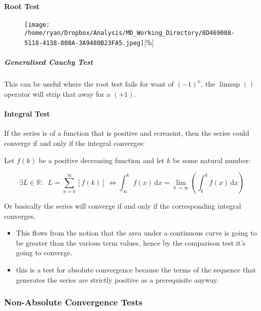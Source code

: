 \documentclass[
]{article}
\let\oldparagraph\paragraph
\renewcommand{\paragraph}[1]{\oldparagraph{#1}\mbox{}}
\let\oldsubparagraph\subparagraph
\renewcommand{\subparagraph}[1]{\oldsubparagraph{#1}\mbox{}}
\begin{document}
\newpage 

\hypertarget{header-n3270}{%
\paragraph{Root Test}\label{header-n3270}}

\begin{figure}
\centering
\texttt{[image: /home/ryan/Dropbox/Analysis/MD\_Working\_Directory/8D469008-5118-4138-808A-3A9480B23FA5.jpeg]}[!h]
\caption{}
\end{figure}

\hypertarget{header-n3274}{%
\subparagraph{\texorpdfstring{Generalised \emph{Cauchy}
Test}{Generalised Cauchy Test}}\label{header-n3274}}

This can be useful where the root test fails for want of \((-1)^n\), the
\(\limsup()\) operator will strip that away for a \((+1)\).

\hypertarget{header-n3276}{%
\paragraph{Integral Test}\label{header-n3276}}

If the series is of a function that is positive and ecreasint, then the
series could converge if and only if the integral converges:

Let \(f(k)\) be a positive decreasing function and let \(k\) be some
natural number:

\[\exists L\in \mathbb{R} : \enspace L = \sum^\infty_{n=k} \left[ f(k) \right] \ \iff \int_\infty^k \! f(x) \, \mathrm{d}x = \lim_{b\rightarrow\infty}\left( \int_b^k \! f(x) \, \mathrm{d}x\right)\]

Or basically the series will converge if and only if the corresponding
integral converges,

\begin{itemize}
\item
  This flows from the notion that the area under a continuous curve is
  going to be greater than the various term values, hence by the
  comparison test it's going to converge.
\item
  this is a test for absolute convergence because the terms of the
  sequence that generates the series are strictly positive as a
  prerequisite anyway.
\end{itemize}

\newpage 

\hypertarget{header-n3286}{%
\subsubsection{Non-Absolute Convergence Tests}\label{header-n3286}}
\end{document}
